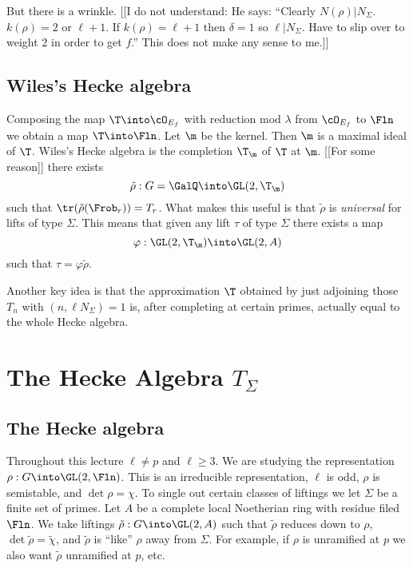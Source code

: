 \documentclass{report}
\begin{document}
But there is a wrinkle. [[I do not understand: He says: ``Clearly
$N(\rho)|N_{\Sigma}$. $k(\rho)=2$ or $\ell+1$. If $k(\rho)=\ell+1$
then $\delta=1$ so $\ell|N_{\Sigma}$. Have to slip over to
weight 2 in order to get $f$.'' This does not make any sense to me.]]



\section{Wiles's Hecke algebra}
Composing the map $\T\into\cO_{E_f}$ with reduction mod $\lambda$
from $\cO_{E_f}$ to $\Fln$ we obtain a map
$\T\into\Fln$. Let $\m$ be the kernel. Then $\m$ is a maximal
ideal of $\T$. Wiles's Hecke algebra is the completion
$\T_{\m}$ of $\T$ at $\m$. [[For some reason]] there exists
$$\tilde{\rho}:G=\GalQ\into\GL(2,\T_{\m})$$
such that $\tr(\tilde{\rho}(\Frob_r))=T_r$.
What makes this useful is that $\tilde{\rho}$ is {\em universal}
for lifts of type $\Sigma$. This means that given any lift $\tau$
of type $\Sigma$ there exists a map
$$\varphi:\GL(2,\T_{\m})\into\GL(2,A)$$ such that
$\tau=\varphi\tilde{\rho}$.

Another key idea is that the approximation $\T$ obtained
by just adjoining those $T_n$ with $(n,\ell N_{\Sigma})=1$
is, after completing at certain primes,
actually equal to the whole Hecke algebra.

\chapter{The Hecke Algebra $T_{\Sigma}$}

\section{The Hecke algebra}
Throughout this lecture $\ell\neq p$ and $\ell\geq 3$.
We are studying the representation $\rho:G\into\GL(2,\Fln)$.
This is an irreducible
representation, $\ell$ is odd, $\rho$ is semistable,
and $\det\rho=\chi$.
To single out certain classes of liftings we let
$\Sigma$ be a finite set of primes. Let $A$ be a complete
local Noetherian ring with residue filed $\Fln$.
We take liftings
$\tilde{\rho}:G\into \GL(2,A)$ such that
$\tilde{\rho}$ reduces down to $\rho$,
$\det\tilde{\rho}=\tilde{\chi}$,
and $\tilde{\rho}$ is ``like'' $\rho$ away from $\Sigma$. For
example, if $\rho$ is unramified at $p$ we also want $\tilde{\rho}$
unramified at $p$, etc.
\end{document}
